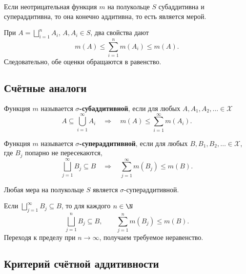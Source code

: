 \newpage
\begin{theorem}
    Если неотрицательная функция $m$ на полукольце $S$ субаддитивна
    и супераддитивна, то она конечно аддитивна, то есть является мерой.
\end{theorem}

\begin{Proof}
    При $A=\bigsqcup_{i=1}^{n}A_i$, $A,A_i\in S$, два свойства дают
    \[
        m(A)\leq\sum_{i=1}^{n}m(A_i)\leq m(A).
    \]
    Следовательно, обе оценки обращаются в равенство.
\end{Proof}

\subsection{Счётные аналоги}

\begin{definition}
    Функция $m$ называется \textbf{$\sigma$-субаддитивной}, если для любых
    $A,A_1,A_2,\ldots\in\mathcal X$
    \[
        A\subseteq\bigcup_{i=1}^{\infty}A_i
        \quad\Longrightarrow\quad
        m(A)\leq\sum_{i=1}^{\infty}m(A_i).
    \]
\end{definition}

\begin{definition}
    Функция $m$ называется \textbf{$\sigma$-супераддитивной}, если для любых
    $B,B_1,B_2,\ldots\in\mathcal X$, где $B_j$ попарно не пересекаются,
    \[
        \bigsqcup_{j=1}^{\infty}B_j\subseteq B
        \quad\Longrightarrow\quad
        \sum_{j=1}^{\infty}m(B_j)\leq m(B).
    \]
\end{definition}

\begin{theorem}
    Любая мера на полукольце $S$ является $\sigma$-супераддитивной.
\end{theorem}

\begin{Proof}
    Если $\bigsqcup_{j=1}^{\infty}B_j\subseteq B$, то для каждого $n\in\N$
    \[
        \bigsqcup_{j=1}^{n}B_j\subseteq B,
        \qquad\sum_{j=1}^{n}m(B_j)\leq m(B).
    \]
    Переходя к пределу при $n\to\infty$, получаем требуемое неравенство.
\end{Proof}

\newpage
\subsection{Критерий счётной аддитивности}


